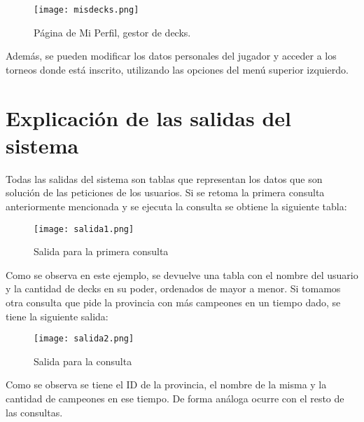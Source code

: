 \documentclass[12pt]{article}
\begin{document}
\begin{figure}[h!]
    \centering
    \texttt{[image: misdecks.png]}
    \caption{Página de Mi Perfil, gestor de decks.}
\end{figure}

Además, se pueden modificar los datos personales del jugador y acceder a los torneos donde está inscrito, utilizando las opciones del menú superior izquierdo.

\section{Explicaci\'on de las salidas del sistema}

Todas las salidas del sistema son tablas que representan los datos que son solución de las peticiones de los usuarios. Si se retoma la primera consulta anteriormente mencionada y se ejecuta la consulta se obtiene la siguiente tabla:

\begin{figure}[h!]
    \centering
    \texttt{[image: salida1.png]}
    \caption{Salida para la primera consulta}
\end{figure}

Como se observa en este ejemplo, se devuelve una tabla con el nombre del usuario y la cantidad de decks en su poder, ordenados de mayor a menor. Si tomamos otra consulta que pide la provincia con más campeones en un tiempo dado, se tiene la siguiente salida:

\begin{figure}[h!]
    \centering
    \texttt{[image: salida2.png]}
    \caption{Salida para la  consulta}
\end{figure}

Como se observa se tiene el ID de la provincia, el nombre de la misma y la cantidad de campeones en ese tiempo. De forma análoga ocurre con el resto de las consultas.
\end{document}
